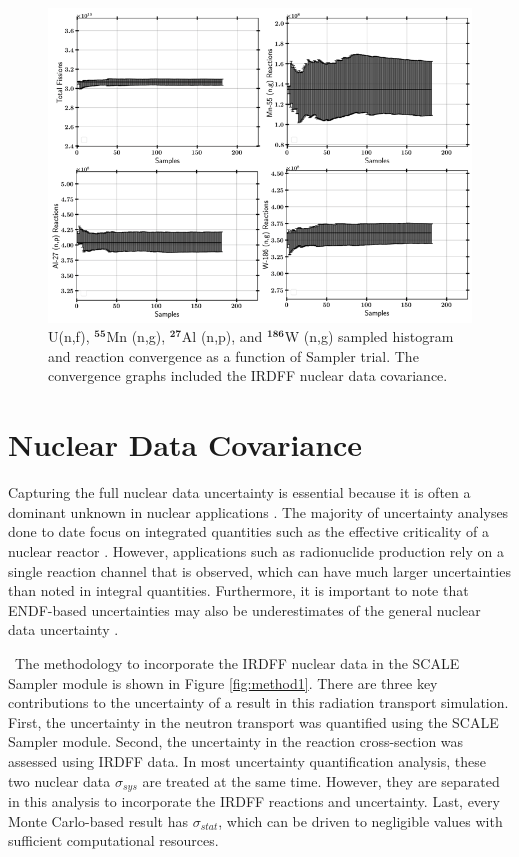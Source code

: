 \begin{figure}[hbt!]	
	\centering
	\includegraphics[width=15cm]{Figures/Chapter3/Convergence1.png}
	\caption[U(n,f), $\mathrm{^{55}}$Mn (n,g),  $\mathrm{^{27}}$Al (n,p), and  $\mathrm{^{186}}$W (n,g) sampled histogram and reaction convergence as a function of Sampler trial.]{U(n,f), $\mathbf{^{55}}$Mn (n,g),  $\mathbf{^{27}}$Al (n,p), and  $\mathbf{^{186}}$W (n,g) sampled histogram and reaction convergence as a function of Sampler trial. The convergence graphs included the IRDFF nuclear data covariance.}
	\label{fig:Convergence1}
\end{figure}

\section{Nuclear Data Covariance}\label{Multi}

Capturing the full nuclear data uncertainty is essential because it is often a dominant unknown in nuclear applications \cite{Campolina2018}. 
The majority of uncertainty analyses done to date focus on integrated quantities such as the effective criticality of a nuclear reactor \cite{Rochman2016}\cite{Griseri2017}.
However, applications such as radionuclide production rely on a single reaction channel that is observed, which can have much larger uncertainties than noted in integral quantities.
Furthermore, it is important to note that ENDF-based uncertainties may also be underestimates of the general nuclear data uncertainty \cite{Bostelmann2017}. 

\ The methodology to incorporate the IRDFF nuclear data in the SCALE Sampler module is shown in Figure \ref{fig:method1}. 
There are three key contributions to the uncertainty of a result in this radiation transport simulation. 
First, the uncertainty in the neutron transport was quantified using the SCALE Sampler module. 
Second, the uncertainty in the reaction cross-section was assessed using IRDFF data. 
In most uncertainty quantification analysis, these two nuclear data $\sigma_{sys}$ are treated at the same time.
However, they are separated in this analysis to incorporate the IRDFF reactions and uncertainty. 
Last, every Monte Carlo-based result has $\sigma_{stat}$, which can be driven to negligible values with sufficient computational resources. 

